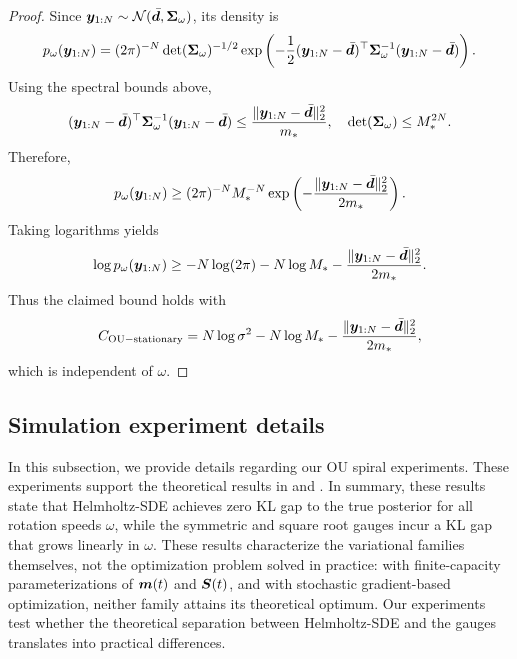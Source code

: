 \begin{proof}
Since $\boldsymbol{y}_{1:N}\sim \mathcal{N}(\bar{\boldsymbol{d}},\boldsymbol{\Sigma}_\omega)$, its density is
\begin{equation*}
    p_\omega(\boldsymbol{y}_{1:N})
    =
    (2\pi)^{-N}
    \det(\boldsymbol{\Sigma}_\omega)^{-1/2}
    \exp\left(
        -\frac{1}{2}
        (\boldsymbol{y}_{1:N}-\bar{\boldsymbol{d}})^\top
        \boldsymbol{\Sigma}_\omega^{-1}
        (\boldsymbol{y}_{1:N}-\bar{\boldsymbol{d}})
    \right).
\end{equation*}
Using the spectral bounds above,
\begin{equation*}
    (\boldsymbol{y}_{1:N}-\bar{\boldsymbol{d}})^\top
    \boldsymbol{\Sigma}_\omega^{-1}
    (\boldsymbol{y}_{1:N}-\bar{\boldsymbol{d}})
    \leq
    \frac{\|\boldsymbol{y}_{1:N}-\bar{\boldsymbol{d}}\|_2^2}{m_*}, \quad
    \det(\boldsymbol{\Sigma}_\omega)
    \leq
    M_*^{2N}.
\end{equation*}
Therefore,
\begin{equation*}
    p_\omega(\boldsymbol{y}_{1:N})
    \geq
    (2\pi)^{-N}
    M_*^{-N}
    \exp\left(
        -\frac{\|\boldsymbol{y}_{1:N}-\bar{\boldsymbol{d}}\|_2^2}{2m_*}
    \right).
\end{equation*}
Taking logarithms yields
\begin{equation*}
    \log p_\omega(\boldsymbol{y}_{1:N})
    \geq
    -N\log(2\pi)
    -
    N\log M_*
    -
    \frac{\|\boldsymbol{y}_{1:N}-\bar{\boldsymbol{d}}\|_2^2}{2m_*}.
\end{equation*}
Thus the claimed bound holds with
\begin{equation*}
    C_{\mathrm{OU-stationary}} = N\log\sigma^2 - N\log M_* - \frac{\|\boldsymbol{y}_{1:N}-\bar{\boldsymbol{d}}\|_2^2}{2m_*},
\end{equation*}
which is independent of $\omega$.
\end{proof}

\subsection{Simulation experiment details}\label{app:subsec:ou-spiral-supplement}

In this subsection, we provide details regarding our OU spiral experiments. 
These experiments support the theoretical results in  and .
In summary, these results state that Helmholtz-SDE achieves zero KL gap to the true posterior for all rotation speeds $\omega$, while the symmetric \cite{course2023state, course2023amortized} and square root \cite{bartosh2025sde} gauges incur a KL gap that grows linearly in $\omega$. 
These results characterize the variational families themselves, not the optimization problem solved in practice: with finite-capacity parameterizations of $\boldsymbol{m}(t)$ and $\boldsymbol{S}(t)$, and with stochastic gradient-based optimization, neither family attains its theoretical optimum. 
Our experiments test whether the theoretical separation between Helmholtz-SDE and the gauges translates into practical differences.

